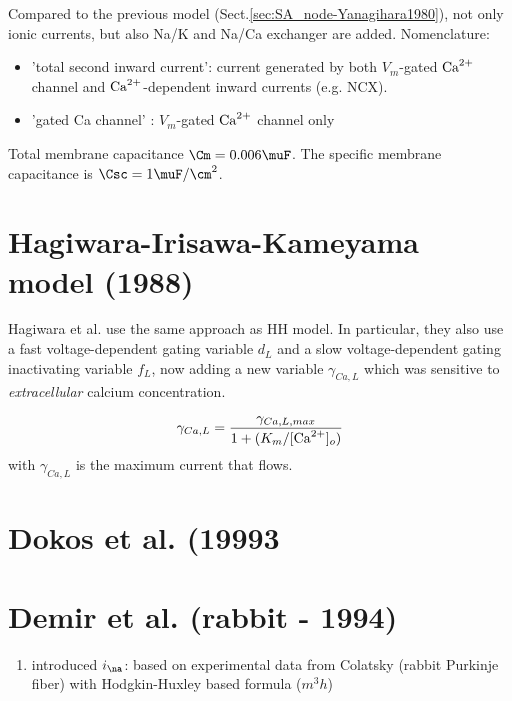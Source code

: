 Compared to the previous model (Sect.\ref{sec:SA_node-Yanagihara1980}), not only
ionic currents, but also Na/K and Na/Ca exchanger are added. Nomenclature:
\begin{itemize}
  \item 'total second inward current': current generated by both $V_m$-gated
  ${\text{Ca}^{2+}}$ channel  and ${\text{Ca}^{2+}}$-dependent inward currents (e.g. NCX).
  \item 'gated Ca channel' : $V_m$-gated ${\text{Ca}^{2+}}$ channel only
\end{itemize}

Total membrane capacitance $\Cm = 0.006 \muF$. The specific membrane capacitance
is $\Csc = 1 \muF/\cm^2$.





\section{Hagiwara-Irisawa-Kameyama model (1988)}
\label{sec:hagiw-iris-kamey}

Hagiwara et al. \citep{hagiwara1988ctt} use the same approach as HH
model. In particular, they also use a fast voltage-dependent gating
variable $d_L$ and a slow voltage-dependent gating inactivating
variable $f_L$, now adding a new variable $\gamma_{Ca,L}$ which was
sensitive to {\it extracellular} calcium concentration.

\begin{equation}
  \label{eq:387}
  \gamma_{Ca,L} = \frac{\gamma_{Ca,L,max}}{1+(K_m/[\ce{Ca^2+}]_o)}
\end{equation}
with $\gamma_{Ca,L}$ is the maximum current that flows.


\section{Dokos et al. (19993}
\label{sec:SA_node_Dokos1994}

\citep{Dokos1993}


\section{Demir et al. (rabbit - 1994)}
\label{sec:SA_node_Demir1994}

\citep{Demir1994}
\begin{enumerate}
  \item introduced $i_\na$: based on experimental data from Colatsky (rabbit
  Purkinje fiber) with Hodgkin-Huxley based formula ($m^3h$)
\end{enumerate}


